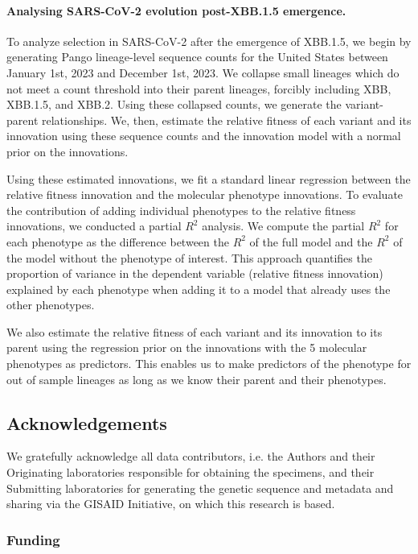 \paragraph{Analysing SARS-CoV-2 evolution post-XBB.1.5 emergence.}

To analyze selection in SARS-CoV-2 after the emergence of XBB.1.5, we begin by generating Pango lineage-level sequence counts for the United States between January 1st, 2023 and December 1st, 2023. 
We collapse small lineages which do not meet a count threshold into their parent lineages, forcibly including XBB, XBB.1.5, and XBB.2.
Using these collapsed counts, we generate the variant-parent relationships.
We, then, estimate the relative fitness of each variant and its innovation using these sequence counts and the innovation model with a normal prior on the innovations.

Using these estimated innovations, we fit a standard linear regression between the relative fitness innovation and the molecular phenotype innovations.
To evaluate the contribution of adding individual phenotypes to the relative fitness innovations, we conducted a partial $R^2$ analysis.
We compute the partial $R^2$ for each phenotype as the difference between the $R^2$ of the full model and the $R^2$ of the model without the phenotype of interest.
This approach quantifies the proportion of variance in the dependent variable (relative fitness innovation) explained by each phenotype when adding it to a model that already uses the other phenotypes.

We also estimate the relative fitness of each variant and its innovation to its parent using the regression prior on the innovations with the 5 molecular phenotypes as predictors.
This enables us to make predictors of the phenotype for out of sample lineages as long as we know their parent and their phenotypes.

\subsection*{Acknowledgements}

We gratefully acknowledge all data contributors, i.e. the Authors and their Originating laboratories responsible for obtaining the specimens, and their Submitting laboratories for generating the genetic sequence and metadata and sharing via the GISAID Initiative, on which this research is based.

\subsubsection*{Funding}

